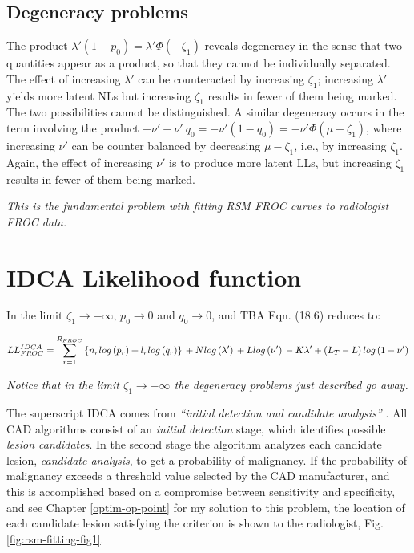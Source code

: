 \documentclass[
]{book}
\begin{document}
\hypertarget{rsm-fitting-froc-degeneracy}{%
\subsection{Degeneracy problems}\label{rsm-fitting-froc-degeneracy}}

The product \(\lambda' \left ( 1-p_0 \right ) = \lambda'\Phi(-\zeta_1)\) reveals degeneracy in the sense that two quantities appear as a product, so that they cannot be individually separated. The effect of increasing \(\lambda'\) can be counteracted by increasing \(\zeta_1\); increasing \(\lambda'\) yields more latent NLs but increasing \(\zeta_1\) results in fewer of them being marked. The two possibilities cannot be distinguished. A similar degeneracy occurs in the term involving the product \(-\nu' + \nu' \ q_0 = -\nu'(1- q_0) = -\nu' \Phi(\mu-\zeta_1)\), where increasing \(\nu'\) can be counter balanced by decreasing \(\mu-\zeta_1\), i.e., by increasing \(\zeta_1\). Again, the effect of increasing \(\nu'\) is to produce more latent LLs, but increasing \(\zeta_1\) results in fewer of them being marked.

\emph{This is the fundamental problem with fitting RSM FROC curves to radiologist FROC data.}

\hypertarget{rsm-fitting-froc-idca}{%
\section{IDCA Likelihood function}\label{rsm-fitting-froc-idca}}

In the limit \(\zeta_1 \rightarrow -\infty\), \(p_0 \rightarrow 0\) and \(q_0 \rightarrow 0\), and TBA Eqn. (18.6) reduces to:

\begin{equation}
LL_{FROC}^{IDCA} = \sum_{r=1}^{R_{FROC}} \left \{ n_r log\left ( p_r \right ) + l_r log\left ( q_r \right ) \right \} \\
+ N log\left ( \lambda' \right ) \\
+ L log\left ( \nu' \right ) \\
- K \lambda'  \\
+ \left ( L_T - L \right ) log \left ( 1 - \nu'  \right )
\label{eq:rsm-fitting-idca-ll}
\end{equation}

\emph{Notice that in the limit \(\zeta_1 \rightarrow -\infty\) the degeneracy problems just described go away.}

The superscript IDCA comes from \emph{``initial detection and candidate analysis''} \citep{edwards2002maximum}. All CAD algorithms consist of an \emph{initial detection} stage, which identifies possible \emph{lesion candidates}. In the second stage the algorithm analyzes each candidate lesion, \emph{candidate analysis}, to get a probability of malignancy. If the probability of malignancy exceeds a threshold value selected by the CAD manufacturer, and this is accomplished based on a compromise between sensitivity and specificity, and see Chapter \ref{optim-op-point} for my solution to this problem, the location of each candidate lesion satisfying the criterion is shown to the radiologist, Fig. \ref{fig:rsm-fitting-fig1}.
\end{document}
